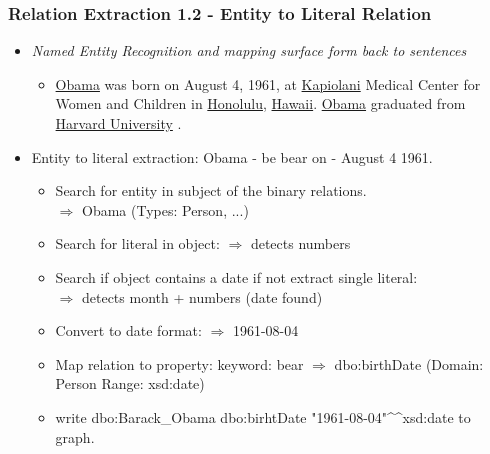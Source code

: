 \documentclass{beamer}
\begin{document}
\begin{frame}
\frametitle{Relation Extraction 1.2 - Entity to Literal Relation}
\begin{example}
	\begin{itemize}
	\item \textit{Named Entity Recognition and mapping surface form back to sentences} \\
	\begin{itemize} \item \underline{Obama} was born on August 4, 1961, at \underline{Kapiolani} Medical Center for Women and Children in \underline{Honolulu}, \underline{Hawaii}. \underline{Obama} graduated from \underline{Harvard University} .
	\end{itemize}
	\item Entity to literal extraction: Obama - be bear on - August 4 1961. \begin{itemize} \item Search for entity in subject of the binary relations. \\ $\Rightarrow$ Obama (Types: Person, ...) 
	\item Search for literal in object: $\Rightarrow$ detects numbers 
	\item Search if object contains a date if not extract single literal: \\ $\Rightarrow$ detects month + numbers (date found)
	\item Convert to date format: $\Rightarrow$  1961-08-04
	\item Map relation to property: keyword: bear  $\Rightarrow$ dbo:birthDate (Domain: Person Range: xsd:date)
	\item write dbo:Barack\_Obama dbo:birhtDate "1961-08-04"\textasciicircum{}\textasciicircum{}xsd:date to graph.
	\end{itemize}		 
\end{itemize}
\end{example}
\end{frame}
\end{document}
